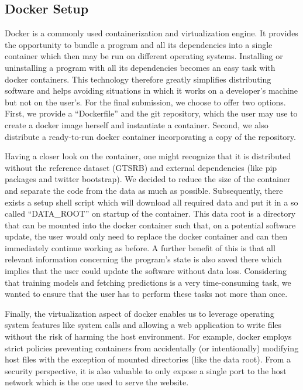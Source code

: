 \subsection{Docker Setup}\label{subsec:docker}
Docker is a commonly used containerization and virtualization engine.
It provides the opportunity to bundle a program and all its dependencies into a single container which then may be run on different operating systems.
Installing or uninstalling a program with all its dependencies becomes an easy task with docker containers.
This technology therefore greatly simplifies distributing software and helps avoiding situations in which it works on a developer's machine but not on the user's.
For the final submission, we choose to offer two options.
First, we provide a \enquote{Dockerfile} and the git repository, which the user may use to create a docker image herself and instantiate a container.
Second, we also distribute a ready-to-run docker container incorporating a copy of the repository.

Having a closer look on the container, one might recognize that it is distributed without the reference dataset (GTSRB) and external dependencies (like pip packages and twitter bootstrap).
We decided to reduce the size of the container and separate the code from the data as much as possible.
Subsequently, there exists a setup shell script which will download all required data and put it in a so called \enquote{DATA\_ROOT} on startup of the container.
This data root is a directory that can be mounted into the docker container such that, on a potential software update, the user would only need to replace the docker container and can then immediately continue working as before.
A further benefit of this is that all relevant information concerning the program's state is also saved there which implies that the user could update the software without data loss.
Considering that training models and fetching predictions is a very time-consuming task, we wanted to ensure that the user has to perform these tasks not more than once.

Finally, the virtualization aspect of docker enables us to leverage operating system features like system calls and allowing a web application to write files without the risk of harming the host environment.
For example, docker employs strict policies preventing containers from accidentally (or intentionally) modifying host files with the exception of mounted directories (like the data root).
From a security perspective, it is also valuable to only expose a single port to the host network which is the one used to serve the website.
